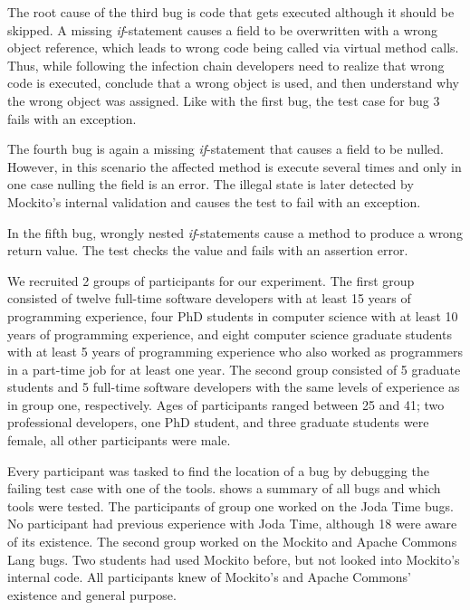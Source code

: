 \documentclass[
			english,
			review,
			]{elsarticle}
\begin{document}
The root cause of the third bug is code that gets executed although it should be skipped.
A missing \textit{if}-statement causes a field to be overwritten with a wrong object reference, which leads to wrong code being called via virtual method calls.
Thus, while following the infection chain developers need to realize that wrong code is executed, conclude that a wrong object is used, and then understand why the wrong object was assigned.
Like with the first bug, the test case for bug 3 fails with an exception.

The fourth bug is again a missing \textit{if}-statement that causes a field to be nulled.
However, in this scenario the affected method is execute several times and only in one case nulling the field is an error.
The illegal state is later detected by Mockito's internal validation and causes the test to fail with an exception.

In the fifth bug, wrongly nested \textit{if}-statements cause a method to produce a wrong return value.
The test checks the value and fails with an assertion error.

We recruited 2 groups of participants for our experiment.
The first group consisted of
twelve full-time software developers with at least 15 years of programming experience, 
four PhD students in computer science with at least 10 years of programming experience,
and eight computer science graduate students with at least 5 years of programming experience who also worked as programmers in a part-time job for at least one year.
The second group consisted of 5 graduate students and 5 full-time software developers with the same levels of experience as in group one, respectively.
Ages of participants ranged between 25 and 41; two professional developers, one PhD student, and three graduate students were female, all other participants were male.

Every participant was tasked to find the location of a bug by debugging the failing test case with one of the tools.
 shows a summary of all bugs and which tools were tested.
The participants of group one worked on the Joda Time bugs.
No participant had previous experience with Joda Time, although 18 were aware of its existence.
The second group worked on the Mockito and Apache Commons Lang bugs.
Two students had used Mockito before, but not looked into Mockito's internal code.
All participants knew of Mockito's and Apache Commons' existence and general purpose.
\end{document}
